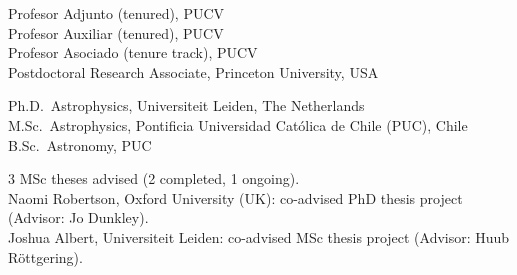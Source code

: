 \documentclass[11pt]{article}
\begin{document}

\noindent
{} Profesor Adjunto (tenured), PUCV\\
 Profesor Auxiliar (tenured), PUCV\\
 Profesor Asociado (tenure track), PUCV\\
 Postdoctoral Research Associate, Princeton University, USA




\noindent
{} Ph.D.~Astrophysics, Universiteit Leiden, The Netherlands\\
 M.Sc.~Astrophysics, Pontificia Universidad Cat\'olica de Chile (PUC), Chile\\
 B.Sc.~Astronomy, PUC\\







\noindent
 3 MSc theses advised (2 completed, 1 ongoing).\\
 Naomi Robertson, Oxford University (UK): co-advised PhD thesis project (Advisor: Jo Dunkley).\\
 Joshua Albert, Universiteit Leiden: co-advised MSc thesis project (Advisor: Huub R\"ottgering). 

\end{document}
